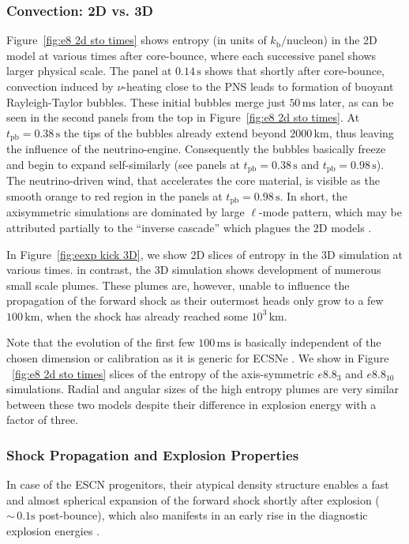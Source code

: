 \documentclass[fleqn,usenatbib]{mnras}
\newcommand{\tpb}{\ensuremath{t_{\text{pb}}}}
\newcommand{\km}{\ensuremath{\mathrm{km}}\xspace}
\renewcommand{\sec}{\xspace\ensuremath{\text{s}}}
\newcommand{\ms}{\xspace\ensuremath{\text{ms}}}
\newcommand{\kbpnuc}{k_{\text{b}}/\text{nucleon}}
\begin{document}
\subsubsection{Convection: 2D vs. 3D}
Figure~\ref{fig:e8 2d sto times} shows entropy (in units of $\kbpnuc$) in the 2D model at various times after core-bounce, where each successive panel shows larger physical scale. The panel at $0.14\, \sec$ shows that shortly after core-bounce, convection induced  by $\nu$-heating close to the PNS leads to formation of buoyant Rayleigh-Taylor bubbles. These initial bubbles merge just $50\,\ms$ later, as can be seen in the second panels from the top in Figure~\ref{fig:e8 2d sto times}. At $\tpb=0.38\,\sec$ the tips of the bubbles already extend beyond $2000\,\km$, thus leaving the influence of the neutrino-engine. Consequently the bubbles basically freeze and begin to expand self-similarly (see panels at $\tpb=0.38\,\sec$ and $\tpb=0.98\,\sec$). The neutrino-driven wind, that accelerates the core material, is visible as the smooth orange to red region in the panels at $\tpb=0.98\,\sec$.
In short, the axisymmetric simulations are dominated by large $\ell$-mode pattern, which may be attributed partially to the ``inverse cascade'' which plagues the 2D models \cite{Kraichnan1967,Mueller2015}.

In Figure~\ref{fig:eexp kick 3D}, we show 2D slices of entropy in the 3D simulation at various times. in contrast, the 3D simulation shows development of numerous small scale plumes. These plumes are, however, unable to influence the propagation of the forward shock as their outermost heads only grow to a few $100 \,\mathrm{km}$, when the shock has already reached some $10^3\,\mathrm{km}$.

Note that the evolution of the first few $100\,\text{ms}$ is basically independent of the chosen dimension or calibration as it is generic for ECSNe \cite{Gessner2018}. We show in Figure ~\ref{fig:e8 2d sto times} slices of the entropy of the axis-symmetric $e8.8_{3}$ and $e8.8_{10}$ simulations. Radial and angular sizes of the high entropy plumes are very similar between these two models despite their difference in explosion energy with a factor of three.

\subsubsection{Shock Propagation and Explosion Properties}
\label{sec:explosion ecsn}
In case of the ESCN progenitors, their atypical density structure enables a fast and almost spherical expansion of the forward shock shortly after explosion ($\mathord{\sim}\, 0.1 \sec$ post-bounce), which also manifests in an early rise in the diagnostic explosion energies \citep{Kitaura2006,Janka2008,Gessner2018}. 
\end{document}
